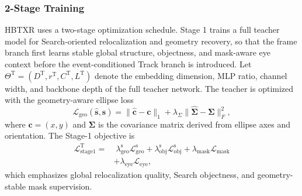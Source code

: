 \documentclass[journal]{IEEEtran}
\begin{document}
\subsubsection{2-Stage Training}
HBTXR uses a two-stage optimization schedule. Stage 1 trains a full teacher model for Search-oriented relocalization and geometry recovery, so that the frame branch first learns stable global structure, objectness, and mask-aware eye context before the event-conditioned Track branch is introduced. Let $\Theta^{\mathrm{T}}=(D^{\mathrm{T}}, r^{\mathrm{T}}, C^{\mathrm{T}}, L^{\mathrm{T}})$ denote the embedding dimension, MLP ratio, channel width, and backbone depth of the full teacher network. The teacher is optimized with the geometry-aware ellipse loss
\begin{equation}
\mathcal L_{\mathrm{geo}}(\hat{\mathbf s},\mathbf s)=
\|\hat{\mathbf c}-\mathbf c\|_1 + \lambda_{\Sigma}\|\hat{\bm\Sigma}-\bm\Sigma\|_F^2,
\end{equation}
where $\mathbf c=(x,y)$ and $\bm\Sigma$ is the covariance matrix derived from ellipse axes and orientation. The Stage-1 objective is
\begin{align}
\mathcal L_{\mathrm{stage1}}^{\mathrm{T}} =
&\;\lambda_{\mathrm{geo}}^{\mathrm{s}}\mathcal L_{\mathrm{geo}}^{\mathrm{s}}
+ \lambda_{\mathrm{obj}}^{\mathrm{s}}\mathcal L_{\mathrm{obj}}^{\mathrm{s}}
+ \lambda_{\mathrm{mask}}\mathcal L_{\mathrm{mask}}
\nonumber\\
&+ \lambda_{\mathrm{eye}}\mathcal L_{\mathrm{eye}},
\end{align}
which emphasizes global relocalization quality, Search objectness, and geometry-stable mask supervision.
\end{document}
